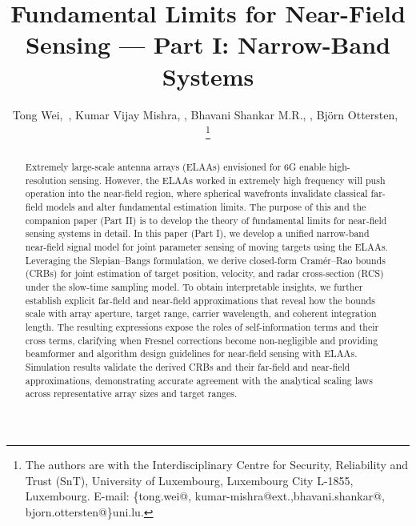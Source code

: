 \documentclass[9pt,final,journal,twocolumn]{IEEEtran}
\begin{document}
\title{Fundamental Limits for Near-Field Sensing --- Part I: Narrow-Band Systems}

\author{Tong Wei,~, Kumar Vijay Mishra, , 
Bhavani Shankar M.R., , Björn Ottersten,~


\thanks{The authors are with the Interdisciplinary Centre for Security, Reliability and Trust (SnT), University of Luxembourg, Luxembourg City L-1855, Luxembourg. E-mail: \{tong.wei@, kumar-mishra@ext.,bhavani.shankar@, bjorn.ottersten@\}uni.lu.}
}

\maketitle 
\vspace{-2.0em}
\vspace{-4cm}
\begin{abstract}
Extremely large-scale antenna arrays (ELAAs) envisioned for 6G enable high-resolution sensing. However, the ELAAs worked in extremely high frequency will push operation into the near-field region, where spherical wavefronts invalidate classical far-field models and alter fundamental estimation limits. The purpose of this and the companion paper (Part II) is to develop the
theory of fundamental limits for near-field sensing systems in detail.
In this paper (Part I), we develop a unified narrow-band near-field signal model for joint parameter sensing of moving targets using the ELAAs. Leveraging the Slepian–Bangs formulation, we derive closed-form Cramér–Rao bounds (CRBs) for joint estimation of target position, velocity, and radar cross-section (RCS) under the slow-time sampling model. To obtain interpretable insights, we further establish explicit far-field and near-field approximations that reveal how the bounds scale with array aperture, target range, carrier wavelength, and coherent integration length. The resulting expressions expose the roles of self-information terms and their cross terms, clarifying when Fresnel corrections become non-negligible and providing beamformer and algorithm design guidelines for near-field sensing with ELAAs. Simulation results validate the derived CRBs and their far-field and near-field approximations, demonstrating accurate agreement with the analytical scaling laws across representative array sizes and target ranges. 
\end{abstract}
\end{document}
